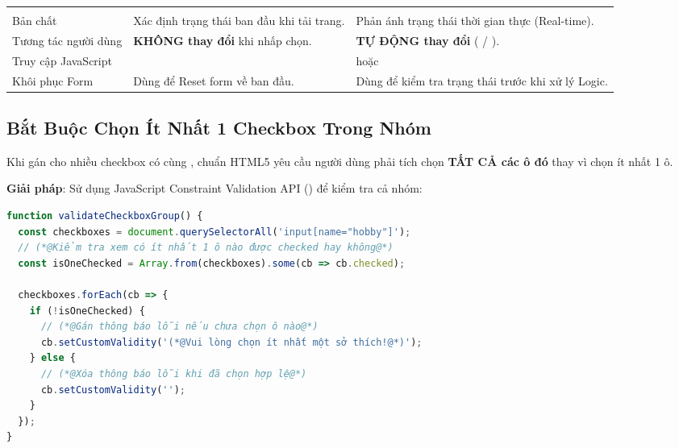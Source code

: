 \begin{prettyTableBox}
\begin{tabularx}{\linewidth}{K{3.5cm}Z Z}
 &  &  \\
Bản chất & Xác định trạng thái ban đầu khi tải trang. & Phản ánh trạng thái thời gian thực (Real-time). \\
Tương tác người dùng & \textbf{KHÔNG thay đổi} khi nhấp chọn. & \textbf{TỰ ĐỘNG thay đổi} ( / ). \\
Truy cập JavaScript &  &  hoặc  \\
Khôi phục Form & Dùng để Reset form về ban đầu. & Dùng để kiểm tra trạng thái trước khi xử lý Logic. \\
\end{tabularx}
\end{prettyTableBox}

\subsection{Bắt Buộc Chọn Ít Nhất 1 Checkbox Trong Nhóm}

\begin{warnBox}
Khi gán  cho nhiều checkbox có cùng , chuẩn HTML5 yêu cầu người dùng phải tích chọn \textbf{TẤT CẢ các ô đó} thay vì chọn ít nhất 1 ô. 
\end{warnBox}

\textbf{Giải pháp}: Sử dụng JavaScript Constraint Validation API () để kiểm tra cả nhóm:

\begin{codeWindow}
\begin{lstlisting}[language=JavaScript]
function validateCheckboxGroup() {
  const checkboxes = document.querySelectorAll('input[name="hobby"]');
  // (*@Kiểm tra xem có ít nhất 1 ô nào được checked hay không@*)
  const isOneChecked = Array.from(checkboxes).some(cb => cb.checked);

  checkboxes.forEach(cb => {
    if (!isOneChecked) {
      // (*@Gán thông báo lỗi nếu chưa chọn ô nào@*)
      cb.setCustomValidity('(*@Vui lòng chọn ít nhất một sở thích!@*)');
    } else {
      // (*@Xóa thông báo lỗi khi đã chọn hợp lệ@*)
      cb.setCustomValidity('');
    }
  });
}
\end{lstlisting}
\end{codeWindow}

